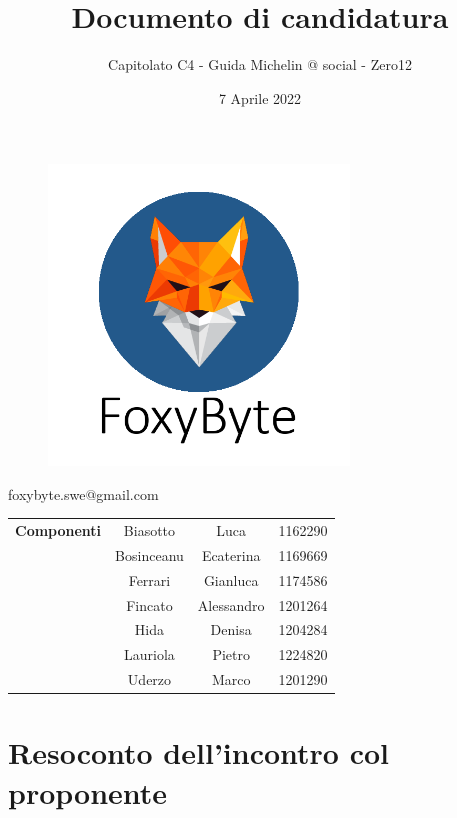 \documentclass[12pt,a4paper]{article}
\title{Documento di candidatura}
\author{Capitolato C4 - Guida Michelin @ social - Zero12}
\date{7 Aprile 2022}
\begin{document}
\begin{figure}[H]
	\centering
	\includegraphics[width=8cm]{FoxyByte_logo_transparency.png}
\end{figure}

\begin{center}
	\textbf{} foxybyte.swe@gmail.com
\end{center}

\begin{table}[H]
	\centering
	\begin{tabular}{c|c c c}
		\textbf{Componenti} & Biasotto     & Luca  & 1162290 \\
		                    & Bosinceanu & Ecaterina & 1169669 \\
		                    & Ferrari   & Gianluca      & 1174586 \\
		                    & Fincato   & Alessandro   & 1201264 \\
		                    & Hida   & Denisa   & 1204284 \\
		                    & Lauriola   & Pietro   & 1224820 \\
		                    & Uderzo   & Marco   & 1201290 \\
	\end{tabular}
\end{table}


\begin{titlepage}
\maketitle
\end{titlepage}

\tableofcontents

\section{Resoconto dell'incontro col proponente}
\end{document}
